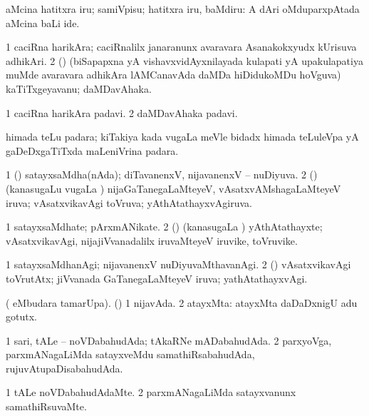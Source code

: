 \noindent 
\gl{\pagu}
\expl{}
 aMcina hatitxra iru; samiVpisu; hatitxra iru, baMdiru:  A dAri oMduparxpAtada aMcina baLi ide. \eentry

\bentry
{} 
\gl{\nA}
\bmng
\bnum
\num{1} caciRna harikAra; caciRnalilx janaranunx avaravara Asanakokxyudx kUrisuva adhikAri. 
\num{2} (\birx) (biSapapxna yA vishavxvidAyxnilayada kulapati yA upakulapatiya muMde avaravara adhikAra lAMCanavAda daMDa hiDidukoMDu hoVguva) kaTiTxgeyavanu; daMDavAhaka. 
\enum
\emng
\eentry

\bentry
{} 
\gl{\nA}
\expl{}
\bmng
\bnum
\num{1} caciRna harikAra padavi. 
\num{2} daMDavAhaka padavi. 
\enum
\emng
\eentry

\bentry
{} 
\gl{\nA}
\expl{}
\bmng
 himada teLu padara; kiTakiya kada \mo vugaLa meVle bidadx himada teLuleVpa yA gaDeDxgaTiTxda maLeniVrina padara. 
\emng
\eentry

\bentry
{} 
\gl{\gu}
\expl{}
\bmng
\bnum
\num{1} (\aupa) satayxsaMdha(nAda); diTavanenxV, nijavanenxV -- nuDiyuva. 
\num{2} (\mashA) (kanasugaLu \mo vugaLa \vi) nijaGaTanegaLaMteyeV, vAsatxvAMshagaLaMteyeV iruva; vAsatxvikavAgi toVruva; yAthAtathayxvAgiruva. 
\enum
\emng
\eentry

\bentry
{} 
\gl{\nA}
\expl{}
\bmng
\bnum
\num{1} satayxsaMdhate; pArxmANikate. 
\num{2} (\mashA) (kanasugaLa \vi) yAthAtathayxte; vAsatxvikavAgi, nijajiVvanadalilx iruvaMteyeV iruvike, toVruvike. 
\enum
\emng
\eentry

\bentry
{} 
\gl{\kirxvi}
\expl{}
\bmng
\bnum
\num{1} satayxsaMdhanAgi; nijavanenxV nuDiyuvaMthavanAgi. 
\num{2} (\mashA) vAsatxvikavAgi toVrutAtx; jiVvanada GaTanegaLaMteyeV iruva; yathAtathayxvAgi. 
\enum
\emng
\eentry

\bentry
{} 
\gl{\gu}
\expl{}
\bmng
 ( eMbudara tamarUpa). (\pArxparx) 
\bnum
\num{1} nijavAda. 
\num{2} atayxMta:  atayxMta daDaDxnigU adu gotutx. 
\enum
\emng
\eentry

\bentry
{} 
\gl{\gu}
\expl{}
\bmng
\bnum
\num{1} sari, tALe -- noVDabahudAda; tAkaRNe mADabahudAda. 
\num{2} parxyoVga, parxmANagaLiMda satayxveMdu samathiRsabahudAda, rujuvAtupaDisabahudAda. 
\enum
\emng
\eentry

\bentry
{} 
\gl{\kirxvi}
\expl{}
\bmng
\bnum
\num{1} tALe noVDabahudAdaMte. 
\num{2} parxmANagaLiMda satayxvanunx samathiRsuvaMte. 
\enum
\emng
\eentry

